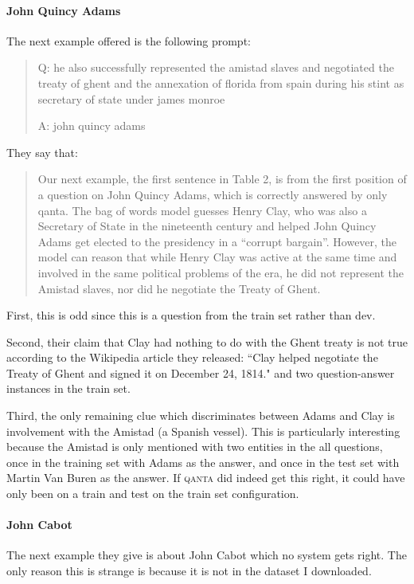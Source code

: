 \documentclass[12pt]{article}
\begin{document}
\paragraph{John Quincy Adams}
The next example offered is the following prompt:
\begin{quote}
Q: he also successfully represented the amistad
   slaves and negotiated the treaty of ghent and
   the annexation of florida from spain during his
   stint as secretary of state under james monroe

A: john quincy adams
\end{quote}

They say that:
\begin{quote}
Our next example, the first sentence in Table
2, is from the first position of a question
on John Quincy Adams, which is correctly answered
by only qanta. The bag of words
model guesses Henry Clay, who was also a Secretary
of State in the nineteenth century and
helped John Quincy Adams get elected to the
presidency in a “corrupt bargain”. However,
the model can reason that while Henry Clay
was active at the same time and involved in
the same political problems of the era, he did
not represent the Amistad slaves, nor did he
negotiate the Treaty of Ghent.
\end{quote}

First, this is odd since this is a question from the train set
rather than dev.

Second, their claim that Clay had nothing to do with the Ghent treaty is
not true according to the Wikipedia article they released:
``Clay helped negotiate the Treaty of Ghent and signed it on December 24, 1814."
and two question-answer instances in the train set.

Third, the only remaining clue which discriminates between Adams and Clay is
involvement with the Amistad (a Spanish vessel).
This is particularly interesting because the Amistad is only mentioned with
two entities in the all questions, once in the training set with Adams as the
answer, and once in the test set with Martin Van Buren as the answer.
If \textsc{qanta} did indeed get this right, it could have only been on a
train and test on the train set configuration.



\paragraph{John Cabot}
The next example they give is about John Cabot which no system
gets right. The only reason this is strange is because it is
not in the dataset I downloaded.
\end{document}
